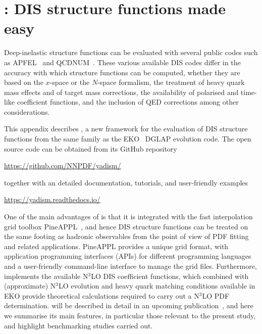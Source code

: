 
\section{\yadism: DIS structure functions made easy}
\label{app:yadism}

Deep-inelastic structure functions can be evaluated with several
public codes such as {\sc\small APFEL}~\cite{Bertone:2013vaa} and
{\sc\small QCDNUM}~\cite{Botje:2010ay}.
%
These various available DIS codes differ in the accuracy with which structure functions can be computed,
whether they are based on the $x$-space or the $N$-space formalism,
the treatment of heavy quark mass effects and of target mass corrections, the availability
of polarised and time-like coefficient functions, and
the inclusion of QED corrections among  other considerations.

This appendix describes \yadism, a new framework
for the evaluation of DIS structure functions from the same family
as the {\sc\small EKO}~\cite{Candido:2022tld} DGLAP evolution code.
%
The open source \yadism code can be obtained from its GitHub repository
\begin{center}
  \url{https://github.com/NNPDF/yadism/}
  \end{center}  
together with an detailed documentation, tutorials, and user-friendly examples
\begin{center}
\url{https://yadism.readthedocs.io/}
\end{center}  
One of the main advantages of \yadism is that it is integrated
with the fast interpolation grid toolbox {\sc\small PineAPPL}~\cite{Carrazza:2020gss},
and hence DIS structure functions can be treated on the same footing as hadronic observables
from the point of view of PDF fitting and related applications.
%
{\sc\small PineAPPL} provides a unique grid format, with application programming interfaces (APIs)
for different programming languages
and a user-friendly command-line interface to manage the grid files.
%
Furthermore, \yadism implements the available N$^3$LO DIS coefficient functions,
which combined with (approximate)  N$^3$LO evolution
and heavy quark matching conditions available in {\sc\small EKO} provide
theoretical calculations required to carry out a N$^3$LO PDF determination.
%
\yadism will be described in detail in an upcoming publication~\cite{yadism},
and here we summarise its main features, in particular those
relevant to the present study, and highlight benchmarking
studies carried out.

